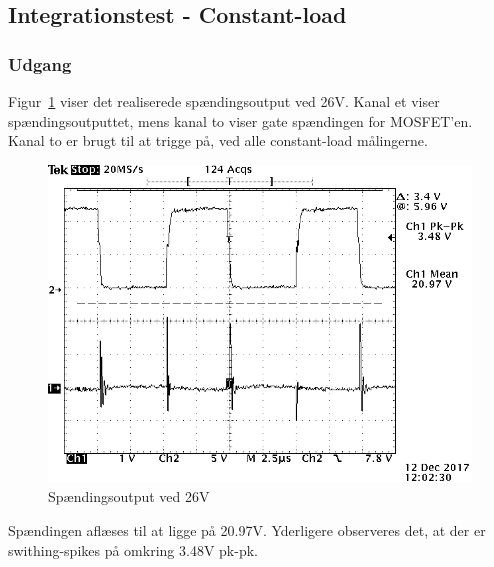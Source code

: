 \subsection{Integrationstest - Constant-load}

\subsubsection{Udgang}
\noindent Figur~\ref{fig: Out26V} viser det realiserede spændingsoutput ved 26V. Kanal et viser spændingsoutputtet, mens kanal to viser gate spændingen for MOSFET'en. Kanal to er brugt til at trigge på, ved alle constant-load målingerne. 
\begin{figure}[H]
	\center
	\includegraphics[max width=0.7\linewidth]{../dokumentation/tex/2iteration/billeder/Realisering/udgang_f_filter_2iteration.png}
	\caption{Spændingsoutput ved 26V}
	\label{fig: Out26V}
\end{figure}
\noindent Spændingen aflæses til at ligge på 20.97V. Yderligere observeres det, at der er swithing-spikes på omkring 3.48V pk-pk.

